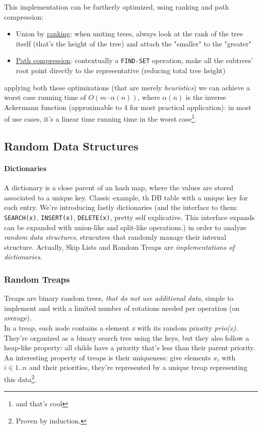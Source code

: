 \documentclass{article}
\begin{document}
				This implementation can be furtherly optimized, using ranking and path compression:
				\begin{itemize}
					\item Union by \underline{ranking}: when uniting trees, always look at the rank of the tree itself (that's the height of the tree) and attach the "smaller" to the "greater"
					\item \underline{Path compression}: contextually a \verb|FIND-SET| operation, make all the subtrees' root point directly to the representative (reducing total tree height)
				\end{itemize}
				applying both these optimizations (that are merely \textit{heuristics}) we can achieve a worst case running time of $O(m \cdot \alpha(n))$, where $\alpha(n)$ is the inverse Ackermann function (approximable to 4 for most practical application): in most of use cases, it's a linear time running time in the worst case\footnote{and that's cool}.
		
		\subsection{Random Data Structures}
			\paragraph{Dictionaries}
				A dictionary is a close parent of an hash map, where the values are stored associated to a unique key. Classic example, th DB table with a unique key for each entry. We're introducing fastly dictionaries (and the interface to them: \verb|SEARCH(x)|, \verb|INSERT(x)|, \verb|DELETE(x)|, pretty self explicative. This interface expands can be expanded with union-like and split-like operations.) in order to analyze \textit{random data structures}, strucutres that randomly manage their internal structure. Actually, Skip Lists and Random Treaps are \textit{implementations of dictionaries}. %
			
			\subsubsection{Random Treaps}
				Treaps are binary random trees, \textit{that do not use additional data}, simple to implement and with a limited number of rotations needed per operation (on average).\\
				In a treap, each node contains a element \emph{x} with its random priority \emph{prio(x)}. They're organized as a binary search tree using the keys, but they also follow a heap-like property: all childs have a priority that's less than their parent priority. An interesting property of treaps is their uniqueness: give elements $x_i$ with $i \in 1..n$ and their priorities, they're represented by a unique treap representing this data\footnote{Proven by induction.}.
\end{document}
